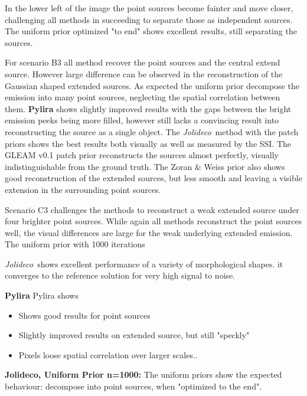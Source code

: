 \documentclass[twocolumn]{aastex631}
\newcommand{\jolideco}{\textit{Jolideco}~}
\begin{document}
    In the lower left of the image the point sources become fainter and move closer, challenging all methods in succeeding to separate those as independent sources. The uniform prior optimized "to end" shows excellent results, still separating the sources. 
    
    For scenario B3 all method recover the point sources and the central extend source. 
    However large difference can be observed in the reconstruction of the Gaussian shaped extended sources. As expected the uniform prior decompose the emission into many point sources, neglecting the spatial correlation between them. \textbf{Pylira} shows slightly improved results with the gaps between the bright emission peeks being more filled, however still lacks a convincing result into reconstructing the source as a single object. The \jolideco method with the patch priors shows the best results both visually as well as measured by the SSI. The GLEAM v0.1 patch prior reconstructs the 
    sources almost perfectly, visually indistinguishable from the ground truth. The Zoran \& Weiss prior also shows good reconstruction of the extended sources, but less smooth and leaving a visible extension in the surrounding point sources.

    Scenario C3 challenges the methods to reconstruct a weak extended source under four brighter point sources. While again all methods reconstruct the point sources well, the visual differences are large for the weak underlying extended emission. The uniform prior with 1000 iterations 
    
    \jolideco shows excellent performance of a variety of morphological shapes. 
    it converges to the reference solution for very high signal to noise.


    \par{\textbf{Pylira}}
    Pylira shows 
    \begin{itemize}
        \item Shows good results for point sources
        \item Slightly improved results on extended source, but still "speckly"
        \item Pixels loose spatial correlation over larger scales..
    \end{itemize}

    
    \par{\textbf{Jolideco, Uniform Prior n=1000:}}
    The uniform priors show the expected behaviour: decompose into point sources, when "optimized to the end".
    
\end{document}
